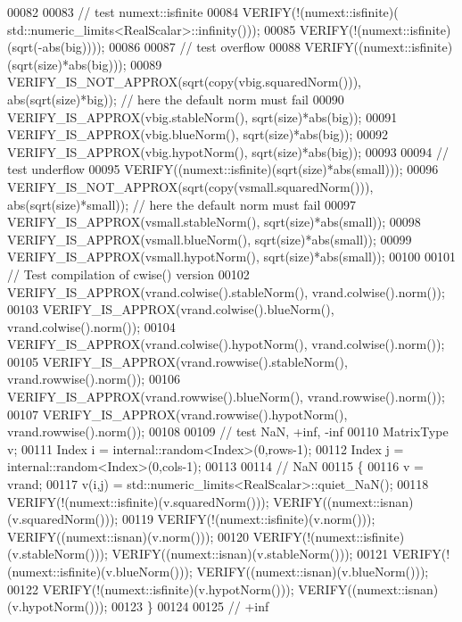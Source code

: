 \begin{DoxyCode}
00082 
00083   \textcolor{comment}{// test numext::isfinite}
00084   VERIFY(!(numext::isfinite)( std::numeric\_limits<RealScalar>::infinity()));
00085   VERIFY(!(numext::isfinite)(sqrt(-abs(big))));
00086 
00087   \textcolor{comment}{// test overflow}
00088   VERIFY((numext::isfinite)(sqrt(size)*abs(big)));
00089   VERIFY\_IS\_NOT\_APPROX(sqrt(copy(vbig.squaredNorm())), abs(sqrt(size)*big)); \textcolor{comment}{// here the default norm must
       fail}
00090   VERIFY\_IS\_APPROX(vbig.stableNorm(), sqrt(size)*abs(big));
00091   VERIFY\_IS\_APPROX(vbig.blueNorm(),   sqrt(size)*abs(big));
00092   VERIFY\_IS\_APPROX(vbig.hypotNorm(),  sqrt(size)*abs(big));
00093 
00094   \textcolor{comment}{// test underflow}
00095   VERIFY((numext::isfinite)(sqrt(size)*abs(small)));
00096   VERIFY\_IS\_NOT\_APPROX(sqrt(copy(vsmall.squaredNorm())),   abs(sqrt(size)*small)); \textcolor{comment}{// here the default norm
       must fail}
00097   VERIFY\_IS\_APPROX(vsmall.stableNorm(), sqrt(size)*abs(small));
00098   VERIFY\_IS\_APPROX(vsmall.blueNorm(),   sqrt(size)*abs(small));
00099   VERIFY\_IS\_APPROX(vsmall.hypotNorm(),  sqrt(size)*abs(small));
00100 
00101   \textcolor{comment}{// Test compilation of cwise() version}
00102   VERIFY\_IS\_APPROX(vrand.colwise().stableNorm(),      vrand.colwise().norm());
00103   VERIFY\_IS\_APPROX(vrand.colwise().blueNorm(),        vrand.colwise().norm());
00104   VERIFY\_IS\_APPROX(vrand.colwise().hypotNorm(),       vrand.colwise().norm());
00105   VERIFY\_IS\_APPROX(vrand.rowwise().stableNorm(),      vrand.rowwise().norm());
00106   VERIFY\_IS\_APPROX(vrand.rowwise().blueNorm(),        vrand.rowwise().norm());
00107   VERIFY\_IS\_APPROX(vrand.rowwise().hypotNorm(),       vrand.rowwise().norm());
00108   
00109   \textcolor{comment}{// test NaN, +inf, -inf }
00110   MatrixType v;
00111   Index i = internal::random<Index>(0,rows-1);
00112   Index j = internal::random<Index>(0,cols-1);
00113 
00114   \textcolor{comment}{// NaN}
00115   \{
00116     v = vrand;
00117     v(i,j) = std::numeric\_limits<RealScalar>::quiet\_NaN();
00118     VERIFY(!(numext::isfinite)(v.squaredNorm()));   VERIFY((numext::isnan)(v.squaredNorm()));
00119     VERIFY(!(numext::isfinite)(v.norm()));          VERIFY((numext::isnan)(v.norm()));
00120     VERIFY(!(numext::isfinite)(v.stableNorm()));    VERIFY((numext::isnan)(v.stableNorm()));
00121     VERIFY(!(numext::isfinite)(v.blueNorm()));      VERIFY((numext::isnan)(v.blueNorm()));
00122     VERIFY(!(numext::isfinite)(v.hypotNorm()));     VERIFY((numext::isnan)(v.hypotNorm()));
00123   \}
00124   
00125   \textcolor{comment}{// +inf}

\end{DoxyCode}
